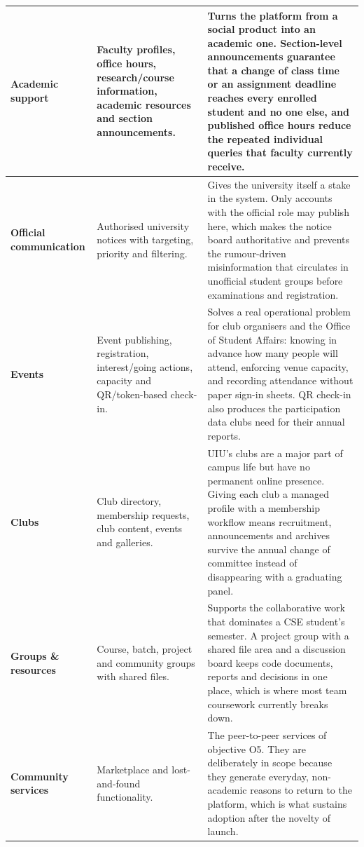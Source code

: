 \documentclass[11pt,a4paper]{report}
\begin{document}
\begin{longtable}{|L{2.6cm}|L{5.1cm}|L{6.2cm}|}
\textbf{Academic support} &
Faculty profiles, office hours, research/course information, academic resources
and section announcements. &
Turns the platform from a social product into an academic one. Section-level
announcements guarantee that a change of class time or an assignment deadline
reaches every enrolled student and no one else, and published office hours
reduce the repeated individual queries that faculty currently receive. \\ \hline

\textbf{Official communication} &
Authorised university notices with targeting, priority and filtering. &
Gives the university itself a stake in the system. Only accounts with the
official role may publish here, which makes the notice board authoritative and
prevents the rumour-driven misinformation that circulates in unofficial student
groups before examinations and registration. \\ \hline

\textbf{Events} &
Event publishing, registration, interest/going actions, capacity and
QR/token-based check-in. &
Solves a real operational problem for club organisers and the Office of Student
Affairs: knowing in advance how many people will attend, enforcing venue
capacity, and recording attendance without paper sign-in sheets. QR check-in
also produces the participation data clubs need for their annual reports. \\ \hline

\textbf{Clubs} &
Club directory, membership requests, club content, events and galleries. &
UIU's clubs are a major part of campus life but have no permanent online
presence. Giving each club a managed profile with a membership workflow means
recruitment, announcements and archives survive the annual change of committee
instead of disappearing with a graduating panel. \\ \hline

\textbf{Groups \& resources} &
Course, batch, project and community groups with shared files. &
Supports the collaborative work that dominates a CSE student's semester. A
project group with a shared file area and a discussion board keeps code
documents, reports and decisions in one place, which is where most team
coursework currently breaks down. \\ \hline

\textbf{Community services} &
Marketplace and lost-and-found functionality. &
The peer-to-peer services of objective O5. They are deliberately in scope
because they generate everyday, non-academic reasons to return to the platform,
which is what sustains adoption after the novelty of launch. \\ \hline


\end{longtable}
\end{document}
